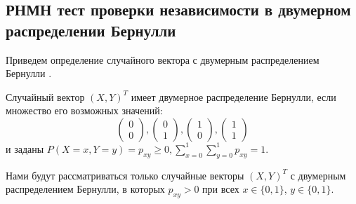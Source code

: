 \subsection{РНМН тест проверки независимости в двумерном
распределении Бернулли}\label{bivariate_umpu}


Приведем определение случайного вектора с 
двумерным распределением Бернулли \cite{Dai2013}.
\begin{definition}
    Случайный вектор $(X,Y)^T$ имеет двумерное распределение Бернулли,
    если множество его возможных значений:
    $$
        \begin{pmatrix}
            0 \\
            0
        \end{pmatrix},
        \begin{pmatrix}
            0 \\
            1
        \end{pmatrix},
        \begin{pmatrix}
            1 \\
            0
        \end{pmatrix},
        \begin{pmatrix}
            1 \\
            1
        \end{pmatrix}
    $$ и заданы $P(X=x,Y=y)=p_{xy} \geq 0,  \sum_{x=0}^1 \sum_{y=0}^1 p_{xy} =1$.
\end{definition}
Нами будут рассматриваться только случайные
векторы $(X,Y)^T$ с двумерным распределением Бернулли,
в которых $p_{xy} > 0$ при всех
$x \in \{0,1\}$, $y\in \{0,1\}$.
